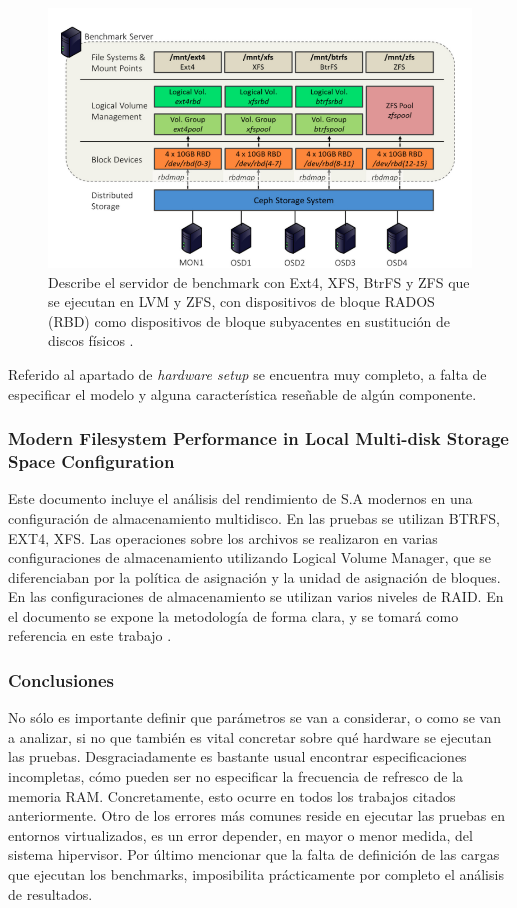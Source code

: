 \begin{figure}[H]
    \centering
    \includegraphics[scale=0.6]{doc/assets/images/Capitulo2/esquema_EA.png}
    \caption{Describe el servidor de benchmark con Ext4, XFS, BtrFS y ZFS que se ejecutan en  LVM y ZFS, con dispositivos de bloque RADOS (RBD) como dispositivos de bloque subyacentes en sustitución de discos físicos \cite{7881982}.}
\end{figure}

Referido al apartado de \textit{hardware setup} se encuentra muy completo, a falta de especificar el modelo y alguna característica reseñable de algún componente.

\subsubsection{Modern Filesystem Performance in Local Multi-disk Storage Space Configuration} 
Este documento incluye el análisis del rendimiento de S.A modernos en una configuración de almacenamiento multidisco.  En las pruebas se utilizan BTRFS, EXT4, XFS.  Las operaciones sobre los archivos se realizaron en varias configuraciones de almacenamiento utilizando Logical Volume Manager, que se diferenciaban por la política de asignación y la unidad de asignación de bloques.  En las configuraciones de almacenamiento se utilizan varios niveles de RAID. En el documento se expone la metodología de forma clara, y se tomará como referencia en este trabajo \cite{Smolinski2014ModernFP}.


\subsubsection{Conclusiones}
No sólo es importante definir que parámetros se van a considerar, o como se van a analizar, si no que también es vital concretar sobre qué hardware se ejecutan las pruebas. Desgraciadamente es bastante usual encontrar especificaciones incompletas, cómo pueden ser no especificar la frecuencia de refresco de la memoria RAM. Concretamente, esto ocurre en todos los trabajos citados anteriormente. Otro de los errores más comunes reside en ejecutar las pruebas en entornos virtualizados, es un error depender, en mayor o menor medida, del sistema hipervisor. Por último mencionar que la falta de definición de las cargas que ejecutan los benchmarks, imposibilita prácticamente por completo el análisis de resultados.\\

